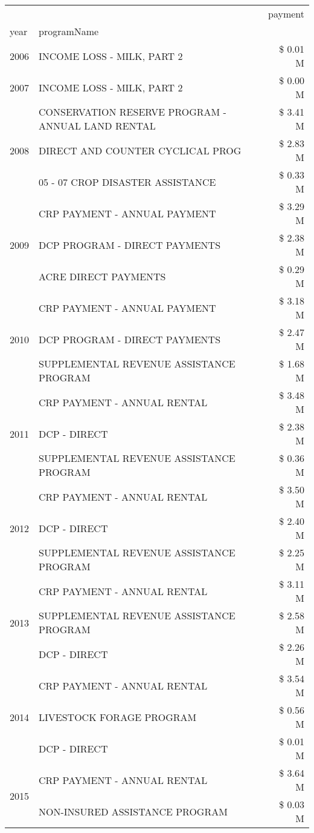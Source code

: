 \begin{tabular}{llr}
\toprule
 &  & payment \\
year & programName &  \\
\midrule
2006 & INCOME LOSS - MILK, PART 2 & \$ 0.01 M \\
\cline{1-3}
2007 & INCOME LOSS - MILK, PART 2 & \$ 0.00 M \\
\cline{1-3}
\multirow[t]{3}{*}{2008} & CONSERVATION RESERVE PROGRAM - ANNUAL LAND RENTAL & \$ 3.41 M \\
 & DIRECT AND COUNTER CYCLICAL PROG & \$ 2.83 M \\
 & 05 - 07 CROP DISASTER ASSISTANCE & \$ 0.33 M \\
\cline{1-3}
\multirow[t]{3}{*}{2009} & CRP PAYMENT - ANNUAL PAYMENT & \$ 3.29 M \\
 & DCP PROGRAM - DIRECT PAYMENTS & \$ 2.38 M \\
 & ACRE DIRECT PAYMENTS & \$ 0.29 M \\
\cline{1-3}
\multirow[t]{3}{*}{2010} & CRP PAYMENT - ANNUAL PAYMENT & \$ 3.18 M \\
 & DCP PROGRAM - DIRECT PAYMENTS & \$ 2.47 M \\
 & SUPPLEMENTAL REVENUE ASSISTANCE PROGRAM & \$ 1.68 M \\
\cline{1-3}
\multirow[t]{3}{*}{2011} & CRP PAYMENT - ANNUAL RENTAL & \$ 3.48 M \\
 & DCP - DIRECT & \$ 2.38 M \\
 & SUPPLEMENTAL REVENUE ASSISTANCE PROGRAM & \$ 0.36 M \\
\cline{1-3}
\multirow[t]{3}{*}{2012} & CRP PAYMENT - ANNUAL RENTAL & \$ 3.50 M \\
 & DCP - DIRECT & \$ 2.40 M \\
 & SUPPLEMENTAL REVENUE ASSISTANCE PROGRAM & \$ 2.25 M \\
\cline{1-3}
\multirow[t]{3}{*}{2013} & CRP PAYMENT - ANNUAL RENTAL & \$ 3.11 M \\
 & SUPPLEMENTAL REVENUE ASSISTANCE PROGRAM & \$ 2.58 M \\
 & DCP - DIRECT & \$ 2.26 M \\
\cline{1-3}
\multirow[t]{3}{*}{2014} & CRP PAYMENT - ANNUAL RENTAL & \$ 3.54 M \\
 & LIVESTOCK FORAGE PROGRAM & \$ 0.56 M \\
 & DCP - DIRECT & \$ 0.01 M \\
\cline{1-3}
\multirow[t]{3}{*}{2015} & CRP PAYMENT - ANNUAL RENTAL & \$ 3.64 M \\
 & NON-INSURED ASSISTANCE PROGRAM & \$ 0.03 M \\

\end{tabular}
